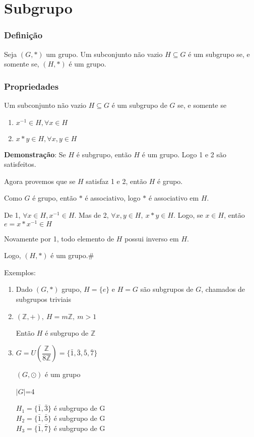 \section{Subgrupo}
\subsubsection{Defini{\c c}{\~a}o}

\begin{definicao}[Subgrupo]
Seja $(G,*)$ um grupo. Um subconjunto n{\~a}o vazio $H\subseteq G$ {\'e} um subgrupo se, e somente se, $(H,*)$ {\'e} um grupo.
\end{definicao}

\subsubsection{Propriedades}
\begin{proposicao}
Um subconjunto n{\~a}o vazio $H\subseteq G$ {\'e} um subgrupo de $G$ se, e somente se
\begin{enumerate}
\item $x^{-1}\in H,\forall x\in H$
\item $x*y\in H,\forall x,y\in H$
\end{enumerate}
\end{proposicao}

\textbf{Demonstra{\c c}{\~a}o}: Se $H$ {\'e} subgrupo, ent{\~a}o $H$ {\'e} um grupo. Logo 1 e 2 s{\~a}o satisfeitos.

Agora provemos que se $H$ satisfaz 1 e 2, ent{\~a}o $H$ {\'e} grupo.

Como $G$ {\'e} grupo, ent{\~a}o $*$ {\'e} associativo, logo $*$ {\'e} associativo em $H$.

De 1, $\forall x\in H,x^{-1}\in H$. Mas de 2, $\forall x,y\in H,\ x*y\in H$. Logo, se $x\in H$, ent{\~a}o $e=x*x^{-1}\in H$

Novamente por 1, todo elemento de $H$ possui inverso em $H$.

Logo, $(H,*)$ {\'e} um grupo.\#

Exemplos:
\begin{enumerate}
\item Dado $(G,*)$ grupo, $H=\{e\}$ e $H=G$ s{\~a}o subgrupos de $G$, chamados de subgrupos triviais
\item $(\mathbb{Z},+),\ H=m\mathbb{Z},\ m>1$

Ent{\~a}o $H$ {\'e} subgrupo de $\mathbb{Z}$
\item $G=U\left(\dfrac{\mathbb{Z}}{8\mathbb{Z}}\right)=\{\bar{1},\bar{3},\bar{5},\bar{7}\}$

$(G,\odot)$ {\'e} um grupo

$|G|$=4

$H_{1}=\{\bar{1},\bar{3}\}$ {\'e} subgrupo de G\\
$H_{2}=\{\bar{1},\bar{5}\}$ {\'e} subgrupo de G\\
$H_{3}=\{\bar{1},\bar{7}\}$ {\'e} subgrupo de G
\end{enumerate}

